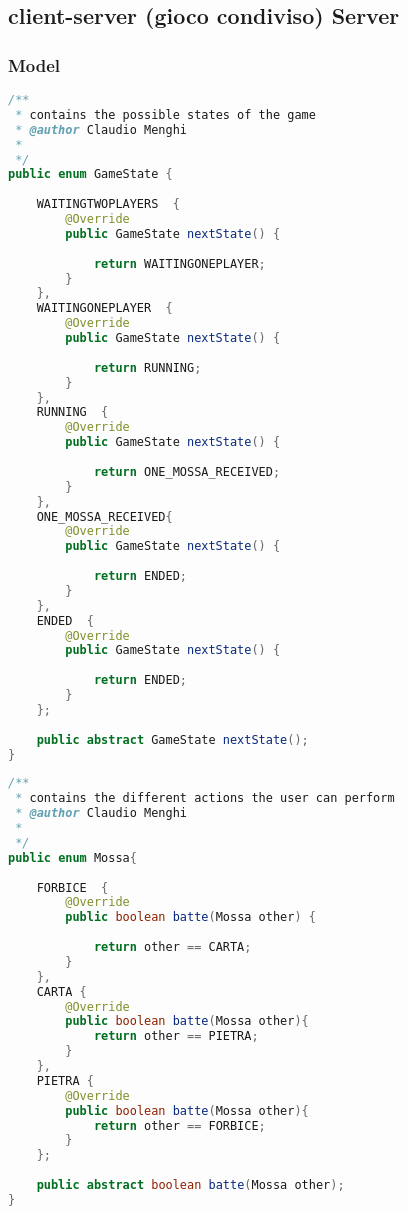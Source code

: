 \documentclass{article}
\begin{document}
\subsection{client-server (gioco condiviso) Server}

\subsubsection{Model}
\begin{lstlisting}[language=Java,escapechar=|]
/**
 * contains the possible states of the game
 * @author Claudio Menghi
 *
 */
public enum GameState {	
	
	WAITINGTWOPLAYERS  {
		@Override
		public GameState nextState() {
			
			return WAITINGONEPLAYER;
		}
	},
	WAITINGONEPLAYER  {
		@Override
		public GameState nextState() {
			
			return RUNNING;
		}
	},
	RUNNING  {
		@Override
		public GameState nextState() {
			
			return ONE_MOSSA_RECEIVED;
		}
	},
	ONE_MOSSA_RECEIVED{
		@Override
		public GameState nextState() {
			
			return ENDED;
		}
	},
	ENDED  {
		@Override
		public GameState nextState() {
			
			return ENDED;
		}
	};
	
	public abstract GameState nextState();
}
\end{lstlisting}
\begin{lstlisting}[language=Java,escapechar=|]
/**
 * contains the different actions the user can perform
 * @author Claudio Menghi
 *
 */
public enum Mossa{	
	
	FORBICE  {
		@Override
		public boolean batte(Mossa other) {
			
			return other == CARTA;
		}
	},	
	CARTA {
		@Override
		public boolean batte(Mossa other){
			return other == PIETRA;
		}
	},
	PIETRA { 
		@Override
		public boolean batte(Mossa other){
			return other == FORBICE;
		} 
	};
	
	public abstract boolean batte(Mossa other);
}
\end{lstlisting}
\end{document}
